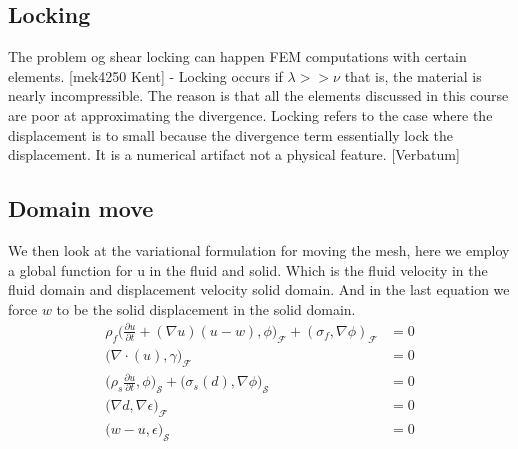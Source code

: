 \subsection*{Locking}
The problem og shear locking can happen FEM computations with certain elements. 
[mek4250 Kent] - Locking occurs if  $ \lambda >> \nu $ that is, the material is nearly incompressible. The reason is that all the elements discussed in this course are poor at approximating the divergence. Locking refers to the case where the displacement is to small because the divergence term essentially lock the displacement. It is a numerical artifact not a physical feature. [Verbatum]


\subsection*{Domain move}

We then look at the variational formulation for moving the mesh, here we employ a global function for u in the fluid and solid. Which is the fluid velocity in the fluid domain and displacement velocity solid domain. And in the last equation we force $w$ to be the solid displacement in the solid domain.
\begin{align*}
\rho_f \big( \frac{\partial u}{\partial t} + (\nabla u)(u-w) , \phi\big)_{\mathcal{F}} + (\sigma_f ,\nabla \phi )_{\mathcal{F}} &= 0  \\
 \big( \nabla \cdot (u ),\gamma \big)_{\mathcal{F}} &= 0 \\
\big(\rho_s \frac{\partial u}{\partial t},\phi \big)_{\mathcal{S}} + \big( \sigma_s(d), \nabla \phi \big)_{\mathcal{S}} &=0 \\
 \big( \nabla d , \nabla \epsilon \big)_{\mathcal{F}} &= 0 \\
 \big( w- u,\epsilon \big)_{\mathcal{S}} &= 0 \\
\end{align*}






